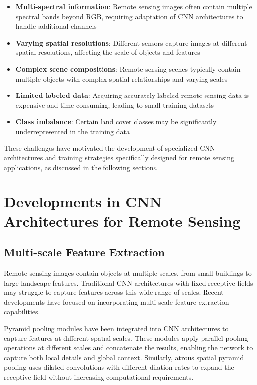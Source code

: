 \documentclass[12pt,a4paper]{article}
\begin{document}
\begin{itemize}
\item \textbf{Multi-spectral information}: Remote sensing images often contain multiple spectral bands beyond RGB, requiring adaptation of CNN architectures to handle additional channels
\item \textbf{Varying spatial resolutions}: Different sensors capture images at different spatial resolutions, affecting the scale of objects and features \cite{cheng2016survey}
\item \textbf{Complex scene compositions}: Remote sensing scenes typically contain multiple objects with complex spatial relationships and varying scales \cite{xia2017aid}
\item \textbf{Limited labeled data}: Acquiring accurately labeled remote sensing data is expensive and time-consuming, leading to small training datasets \cite{zhu2017deep}
\item \textbf{Class imbalance}: Certain land cover classes may be significantly underrepresented in the training data
\end{itemize}

These challenges have motivated the development of specialized CNN architectures and training strategies specifically designed for remote sensing applications, as discussed in the following sections.

\section{Developments in CNN Architectures for Remote Sensing}
\label{sec:developments}

\subsection{Multi-scale Feature Extraction}
Remote sensing images contain objects at multiple scales, from small buildings to large landscape features. Traditional CNN architectures with fixed receptive fields may struggle to capture features across this wide range of scales. Recent developments have focused on incorporating multi-scale feature extraction capabilities.

Pyramid pooling modules have been integrated into CNN architectures to capture features at different spatial scales. These modules apply parallel pooling operations at different scales and concatenate the results, enabling the network to capture both local details and global context. Similarly, atrous spatial pyramid pooling uses dilated convolutions with different dilation rates to expand the receptive field without increasing computational requirements.
\end{document}
